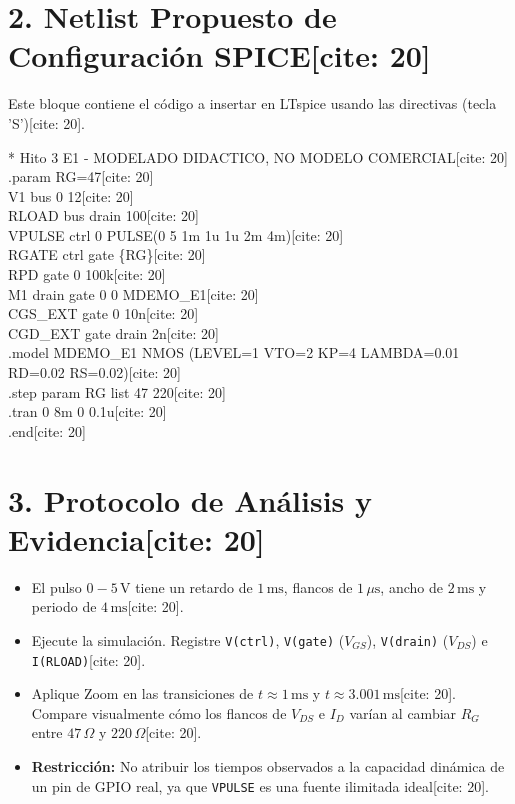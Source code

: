 \documentclass[11pt, a4paper]{article}
\begin{document}
\section*{2. Netlist Propuesto de Configuración SPICE[cite: 20]}
Este bloque contiene el código a insertar en LTspice usando las directivas (tecla 'S')[cite: 20].
\begin{tcolorbox}[colback=black!5, colframe=black, fontupper=\ttfamily, sharp corners]
* Hito 3 E1 - MODELADO DIDACTICO, NO MODELO COMERCIAL[cite: 20] \\
.param RG=47[cite: 20] \\
V1 bus 0 12[cite: 20] \\
RLOAD bus drain 100[cite: 20] \\
VPULSE ctrl 0 PULSE(0 5 1m 1u 1u 2m 4m)[cite: 20] \\
RGATE ctrl gate \{RG\}[cite: 20] \\
RPD gate 0 100k[cite: 20] \\
M1 drain gate 0 0 MDEMO\_E1[cite: 20] \\
CGS\_EXT gate 0 10n[cite: 20] \\
CGD\_EXT gate drain 2n[cite: 20] \\
.model MDEMO\_E1 NMOS (LEVEL=1 VTO=2 KP=4 LAMBDA=0.01 RD=0.02 RS=0.02)[cite: 20] \\
.step param RG list 47 220[cite: 20] \\
.tran 0 8m 0 0.1u[cite: 20] \\
.end[cite: 20]
\end{tcolorbox}

\section*{3. Protocolo de Análisis y Evidencia[cite: 20]}
\begin{itemize}
    \setlength\itemsep{0.2em}
    \item El pulso $0-5\,\text{V}$ tiene un retardo de $1\,\text{ms}$, flancos de $1\,\mu\text{s}$, ancho de $2\,\text{ms}$ y periodo de $4\,\text{ms}$[cite: 20].
    \item Ejecute la simulación. Registre \texttt{V(ctrl)}, \texttt{V(gate)} ($V_{GS}$), \texttt{V(drain)} ($V_{DS}$) e \texttt{I(RLOAD)}[cite: 20].
    \item Aplique Zoom en las transiciones de $t \approx 1\,\text{ms}$ y $t \approx 3.001\,\text{ms}$[cite: 20]. Compare visualmente cómo los flancos de $V_{DS}$ e $I_D$ varían al cambiar $R_G$ entre $47\,\Omega$ y $220\,\Omega$[cite: 20].
    \item \textbf{Restricción:} No atribuir los tiempos observados a la capacidad dinámica de un pin de GPIO real, ya que \texttt{VPULSE} es una fuente ilimitada ideal[cite: 20].
\end{itemize}
\end{document}
